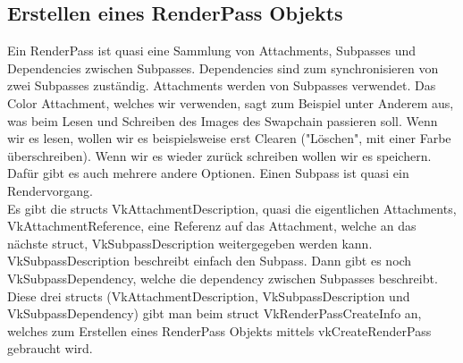 \documentclass[11pt,a4paper]{report}
\begin{document}
\subsection{Erstellen eines RenderPass Objekts}
Ein RenderPass ist quasi eine Sammlung von Attachments, Subpasses und Dependencies zwischen Subpasses. Dependencies sind zum synchronisieren von zwei Subpasses zuständig. Attachments werden von Subpasses verwendet. Das Color Attachment, welches wir verwenden, sagt zum Beispiel unter Anderem aus, was beim Lesen und Schreiben des Images des Swapchain passieren soll. Wenn wir es lesen, wollen wir es beispielsweise erst Clearen ("Löschen", mit einer Farbe überschreiben). Wenn wir es wieder zurück schreiben wollen wir es speichern. Dafür gibt es auch mehrere andere Optionen. Einen Subpass ist quasi ein Rendervorgang.\\
Es gibt die structs VkAttachmentDescription, quasi die eigentlichen Attachments, VkAttachmentReference, eine Referenz auf das Attachment, welche an das nächste struct, VkSubpassDescription weitergegeben werden kann. VkSubpassDescription beschreibt einfach den Subpass. Dann gibt es noch VkSubpassDependency, welche die dependency zwischen Subpasses beschreibt. Diese drei structs (VkAttachmentDescription, VkSubpassDescription und VkSubpassDependency) gibt man beim struct VkRenderPassCreateInfo an, welches zum Erstellen eines RenderPass Objekts mittels vkCreateRenderPass gebraucht wird.
\end{document}
